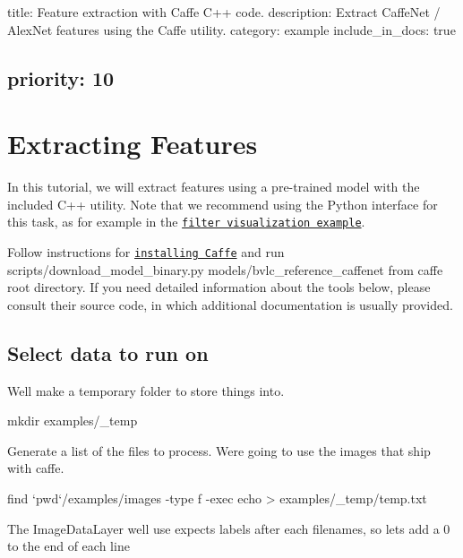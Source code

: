 

 title\+: Feature extraction with Caffe C++ code. description\+: Extract Caffe\+Net / Alex\+Net features using the Caffe utility. category\+: example include\+\_\+in\+\_\+docs\+: true \subsection*{priority\+: 10 }

\section*{Extracting Features }

In this tutorial, we will extract features using a pre-\/trained model with the included C++ utility. Note that we recommend using the Python interface for this task, as for example in the \href{http://nbviewer.ipython.org/github/BVLC/caffe/blob/master/examples/00-classification.ipynb}{\tt filter visualization example}.

Follow instructions for \href{../../installation.html}{\tt installing Caffe} and run {\ttfamily scripts/download\+\_\+model\+\_\+binary.\+py models/bvlc\+\_\+reference\+\_\+caffenet} from caffe root directory. If you need detailed information about the tools below, please consult their source code, in which additional documentation is usually provided.

\subsection*{Select data to run on }

We\textquotesingle{}ll make a temporary folder to store things into. \begin{DoxyVerb}mkdir examples/_temp
\end{DoxyVerb}


Generate a list of the files to process. We\textquotesingle{}re going to use the images that ship with caffe. \begin{DoxyVerb}find `pwd`/examples/images -type f -exec echo {} \; > examples/_temp/temp.txt
\end{DoxyVerb}


The {\ttfamily Image\+Data\+Layer} we\textquotesingle{}ll use expects labels after each filenames, so let\textquotesingle{}s add a 0 to the end of each line 


